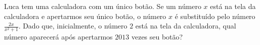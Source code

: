 Luca tem uma calculadora com um único botão. Se um número $x$ está na tela da calculadora e apertarmos seu único botão, o número $x$ é substituído pelo número $\frac{2x}{x^2 + 1}$. Dado que, inicialmente, o número $2$ está na tela da calculadora, qual número aparecerá após apertarmos $2013$ vezes seu botão?
